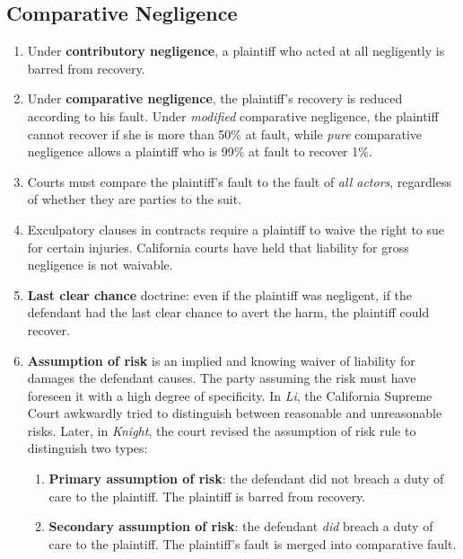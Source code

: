\subsection{Comparative Negligence}

\begin{enumerate}
    \item Under \textbf{contributory negligence}, a plaintiff who acted at all 
    negligently is barred from recovery.
    \item Under \textbf{comparative negligence}, the plaintiff's recovery is 
    reduced according to his fault. Under \emph{modified} comparative 
    negligence, the plaintiff cannot recover if she is more than 50\% at 
    fault, while \emph{pure} comparative negligence allows a plaintiff who is 
    99\% at fault to recover 1\%.
    \item Courts must compare the plaintiff's fault to the fault of \emph{all 
    actors}, regardless of whether they are parties to the suit.
    \item Exculpatory clauses in contracts require a plaintiff to waive the 
    right to sue for certain injuries. California courts have held that 
    liability for gross negligence is not waivable.
    \item \textbf{Last clear chance} doctrine: even if the plaintiff was 
    negligent, if the defendant had the last clear chance to avert the harm, 
    the plaintiff could recover.
    \item \textbf{Assumption of risk} is an implied and knowing waiver of 
    liability for damages the defendant causes. The party assuming the risk 
    must have foreseen it with a high degree of specificity. In \emph{Li}, the 
    California Supreme Court awkwardly tried to distinguish between reasonable 
    and unreasonable risks. Later, in \emph{Knight}, the court revised the 
    assumption of risk rule to distinguish two types:
    \begin{enumerate}
        \item \textbf{Primary assumption of risk}: the defendant did not 
        breach a duty of care to the plaintiff. The plaintiff is barred from 
        recovery.
        \item \textbf{Secondary assumption of risk}: the defendant \emph{did} 
        breach a duty of care to the plaintiff. The plaintiff's fault is 
        merged into comparative fault.
    \end{enumerate}

\end{enumerate}
